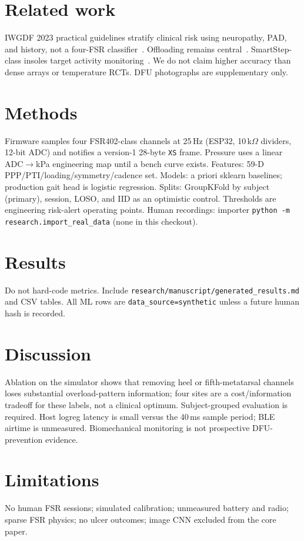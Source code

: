 \documentclass[runningheads]{llncs}
\begin{document}
\section{Related work}
IWGDF 2023 practical guidelines stratify clinical risk using neuropathy, PAD, and history, not a four-FSR classifier~\cite{iwgdf2023}. Offloading remains central~\cite{bus2016,cavanagh2010}. SmartStep-class insoles target activity monitoring~\cite{hegde2014}. We do not claim higher accuracy than dense arrays or temperature RCTs. DFU photographs are supplementary only.

\section{Methods}
Firmware samples four FSR402-class channels at 25\,Hz (ESP32, 10\,k$\Omega$ dividers, 12-bit ADC) and notifies a version-1 28-byte \texttt{XS} frame. Pressure uses a linear ADC$\to$kPa engineering map until a bench curve exists. Features: 59-D PPP/PTI/loading/symmetry/cadence set. Models: a priori sklearn baselines; production gait head is logistic regression. Splits: GroupKFold by subject (primary), session, LOSO, and IID as an optimistic control. Thresholds are engineering risk-alert operating points. Human recordings: importer \texttt{python -m research.import\_real\_data} (none in this checkout).

\section{Results}
Do not hard-code metrics. Include \texttt{research/manuscript/generated\_results.md} and CSV tables. All ML rows are \texttt{data\_source=synthetic} unless a future human hash is recorded.

\section{Discussion}
Ablation on the simulator shows that removing heel or fifth-metatarsal channels loses substantial overload-pattern information; four sites are a cost/information tradeoff for these labels, not a clinical optimum. Subject-grouped evaluation is required. Host logreg latency is small versus the 40\,ms sample period; BLE airtime is unmeasured. Biomechanical monitoring is not prospective DFU-prevention evidence.

\section{Limitations}
No human FSR sessions; simulated calibration; unmeasured battery and radio; sparse FSR physics; no ulcer outcomes; image CNN excluded from the core paper.
\end{document}
